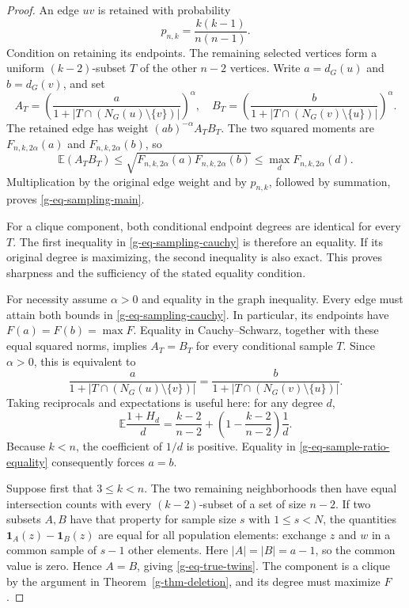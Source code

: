\documentclass[11pt,a4paper]{article}
\theoremstyle{definition}
\theoremstyle{remark}
\begin{document}
\begin{proof}
An edge $uv$ is retained with probability
\[
 p_{n,k}=\frac{k(k-1)}{n(n-1)}.
\]
Condition on retaining its endpoints.  The remaining selected vertices
form a uniform $(k-2)$-subset $T$ of the other $n-2$ vertices.  Write
$a=d_G(u)$ and $b=d_G(v)$, and set
\[
 A_T=\left(\frac a{1+|T\cap(N_G(u)\setminus\{v\})|}\right)^\alpha,
 \quad
 B_T=\left(\frac b{1+|T\cap(N_G(v)\setminus\{u\})|}\right)^\alpha.
\]
The retained edge has weight $(ab)^{-\alpha}A_TB_T$.  The two squared
moments are $F_{n,k,2\alpha}(a)$ and $F_{n,k,2\alpha}(b)$, so
\begin{equation}
 \mathbb E(A_TB_T)
 \le\sqrt{F_{n,k,2\alpha}(a)F_{n,k,2\alpha}(b)}
 \le\max_dF_{n,k,2\alpha}(d).
 \label{g-eq-sampling-cauchy}
\end{equation}
Multiplication by the original edge weight and by $p_{n,k}$, followed by
summation, proves \eqref{g-eq-sampling-main}.

For a clique component, both conditional endpoint degrees are identical
for every $T$.  The first inequality in \eqref{g-eq-sampling-cauchy} is
therefore an equality.  If its original degree is maximizing, the second
inequality is also exact.  This proves sharpness and the sufficiency of
the stated equality condition.

For necessity assume $\alpha>0$ and equality in the graph inequality.
Every edge must attain both bounds in
\eqref{g-eq-sampling-cauchy}.  In particular, its endpoints have
$F(a)=F(b)=\max F$.  Equality in Cauchy--Schwarz, together with these equal
squared norms, implies $A_T=B_T$ for every conditional sample $T$.
Since $\alpha>0$, this is equivalent to
\begin{equation}
 \frac a{1+|T\cap(N_G(u)\setminus\{v\})|}
 =
 \frac b{1+|T\cap(N_G(v)\setminus\{u\})|}.
 \label{g-eq-sample-ratio-equality}
\end{equation}
Taking reciprocals and expectations is useful here: for any degree $d$,
\begin{equation}
 \mathbb E\frac{1+H_d}{d}
 =\frac{k-2}{n-2}
  +\left(1-\frac{k-2}{n-2}\right)\frac1d.
 \label{g-eq-reciprocal-mean}
\end{equation}
Because $k<n$, the coefficient of $1/d$ is positive.  Equality in
\eqref{g-eq-sample-ratio-equality} consequently forces $a=b$.

Suppose first that $3\le k<n$.  The two remaining neighborhoods then
have equal intersection counts with every $(k-2)$-subset of a set of
size $n-2$.  If two subsets $A,B$ have that property for sample size
$s$ with $1\le s<N$, the quantities
$\mathbf1_A(z)-\mathbf1_B(z)$ are equal for all population elements:
exchange $z$ and $w$ in a common sample of $s-1$ other elements.
Here $|A|=|B|=a-1$, so the common value is zero.  Hence $A=B$, giving
\eqref{g-eq-true-twins}.  The component is a clique by the argument in
Theorem~\ref{g-thm-deletion}, and its degree must maximize $F$.


\end{proof}
\end{document}
